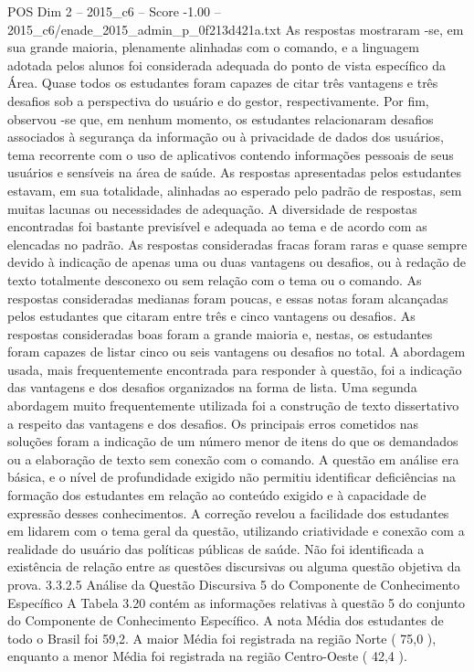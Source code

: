 \begin{textsample}{POS Dim 2 – 2015\_c6 – Score -1.00 – 2015\_c6/enade\_2015\_admin\_p\_0f213d421a.txt}
As respostas mostraram -se, em sua grande maioria, plenamente alinhadas com o comando, e a linguagem adotada pelos alunos foi considerada adequada do ponto de vista específico da Área.
Quase todos os estudantes foram capazes de citar três vantagens e três desafios sob a perspectiva do usuário e do gestor, respectivamente.
Por fim, observou -se que, em nenhum momento, os estudantes relacionaram desafios associados à segurança da informação ou à privacidade de dados dos usuários, tema recorrente com o uso de aplicativos contendo informações pessoais de seus usuários e sensíveis na área de saúde.
As respostas apresentadas pelos estudantes estavam, em sua totalidade, alinhadas ao esperado pelo padrão de respostas, sem muitas lacunas ou necessidades de adequação.
A diversidade de respostas encontradas foi bastante previsível e adequada ao tema e de acordo com as elencadas no padrão.
As respostas consideradas fracas foram raras e quase sempre devido à indicação de apenas uma ou duas vantagens ou desafios, ou à redação de texto totalmente desconexo ou sem relação com o tema ou o comando.
As respostas consideradas medianas foram poucas, e essas notas foram alcançadas pelos estudantes que citaram entre três e cinco vantagens ou desafios.
As respostas consideradas boas foram a grande maioria e, nestas, os estudantes foram capazes de listar cinco ou seis vantagens ou desafios no total.
A abordagem usada, mais frequentemente encontrada para responder à questão, foi a indicação das vantagens e dos desafios organizados na forma de lista.
Uma segunda abordagem muito frequentemente utilizada foi a construção de texto dissertativo a respeito das vantagens e dos desafios.
Os principais erros cometidos nas soluções foram a indicação de um número menor de itens do que os demandados ou a elaboração de texto sem conexão com o comando.
A questão em análise era básica, e o nível de profundidade exigido não permitiu identificar deficiências na formação dos estudantes em relação ao conteúdo exigido e à capacidade de expressão desses conhecimentos.
A correção revelou a facilidade dos estudantes em lidarem com o tema geral da questão, utilizando criatividade e conexão com a realidade do usuário das políticas públicas de saúde.
Não foi identificada a existência de relação entre as questões discursivas ou alguma questão objetiva da prova. 3.3.2.5 Análise da Questão Discursiva 5 do Componente de Conhecimento Específico A Tabela 3.20 contém as informações relativas à questão 5 do conjunto do Componente de Conhecimento Específico.
A nota Média dos estudantes de todo o Brasil foi 59,2.
A maior Média foi registrada na região Norte ( 75,0 ), enquanto a menor Média foi registrada na região Centro-Oeste ( 42,4 ).

\end{textsample}
